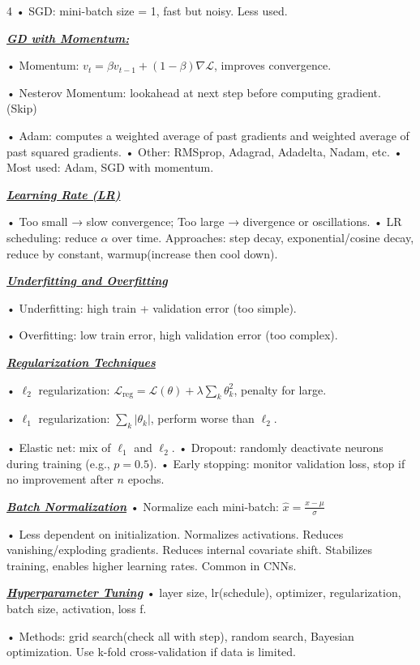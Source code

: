 \documentclass[10pt]{article}
\newcommand{\bulletPoint}[1]{\ul{\textit{\textbf{#1}}}}
\begin{document}
\begin{multicols*}{4}
• SGD: mini-batch size = 1, fast but noisy. Less used. 

\bulletPoint{GD with Momentum:}

• Momentum: $v_t = \beta v_{t-1} + (1-\beta) \nabla \mathcal{L}$, improves convergence. \quad

• Nesterov Momentum: lookahead at next step before computing gradient. (Skip)

• Adam: computes a weighted average of past gradients and weighted average of past squared gradients. 
• Other: RMSprop, Adagrad, Adadelta, Nadam, etc. 
• Most used: Adam, SGD with momentum.

\bulletPoint{Learning Rate (LR)} 

• Too small → slow convergence; Too large → divergence or oscillations. 
• LR scheduling: reduce $\alpha$ over time. 
Approaches: step decay, exponential/cosine decay, reduce by constant, warmup(increase then cool down).

\bulletPoint{Underfitting and Overfitting} 

• Underfitting: high train + validation error (too simple). 

• Overfitting: low train error, high validation error (too complex). 

\bulletPoint{Regularization Techniques} \quad

• $\ell_2$ regularization: $\mathcal{L}_{\text{reg}} = \mathcal{L}(\theta) + \lambda \sum_k \theta_k^2$, penalty for large.

• $\ell_1$ regularization: $\sum_k |\theta_k|$, perform worse than $\ell_2$. \quad

• Elastic net: mix of $\ell_1$ and $\ell_2$. \quad
• Dropout: randomly deactivate neurons during training (e.g., $p=0.5$). \quad
• Early stopping: monitor validation loss, stop if no improvement after $n$ epochs.

\bulletPoint{Batch Normalization} \quad
• Normalize each mini-batch: $\hat{x} = \frac{x - \mu}{\sigma}$ \quad

• Less dependent on initialization. Normalizes activations. Reduces vanishing/exploding gradients. Reduces internal covariate shift.
Stabilizes training, enables higher learning rates. Common in CNNs.

\bulletPoint{Hyperparameter Tuning} \quad
• layer size, lr(schedule), optimizer, regularization, batch size, activation, loss f. \quad

• Methods: grid search(check all with step), random search, Bayesian optimization. Use k-fold cross-validation if data is limited.


\end{multicols*}
\end{document}
